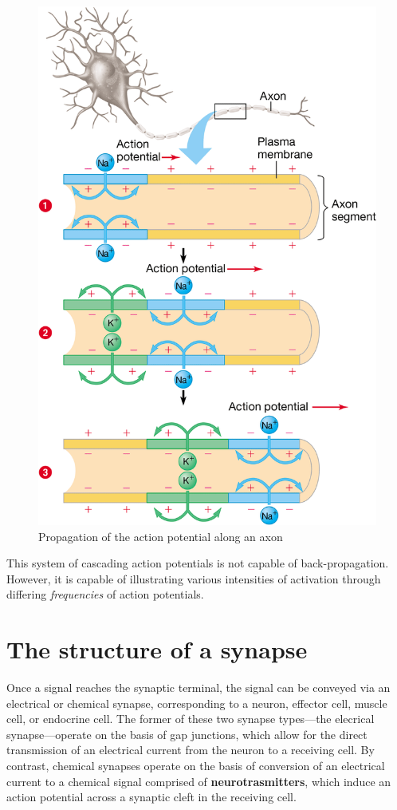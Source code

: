 \documentclass{article}
\begin{document}
\begin{figure}[h]
	\centering
	\includegraphics[width=0.5\linewidth]{action_potential_domino_effect.png}
	\caption{Propagation of the action potential along an axon}
\end{figure}

This system of cascading action potentials is not capable of back-propagation.
However, it is capable of illustrating various intensities of activation through
differing \emph{frequencies} of action potentials.

\section{The structure of a synapse}

Once a signal reaches the synaptic terminal, the signal can be conveyed via an
electrical or chemical synapse, corresponding to a neuron, effector cell, muscle
cell, or endocrine cell. The former of these two synapse types---the elecrical
synapse---operate on the basis of gap junctions, which allow for the direct
transmission of an electrical current from the neuron to a receiving cell. By
contrast, chemical synapses operate on the basis of conversion of an electrical
current to a chemical signal comprised of \textbf{neurotrasmitters}, which
induce an action potential across a synaptic cleft in the receiving cell.

\newpage
\end{document}
